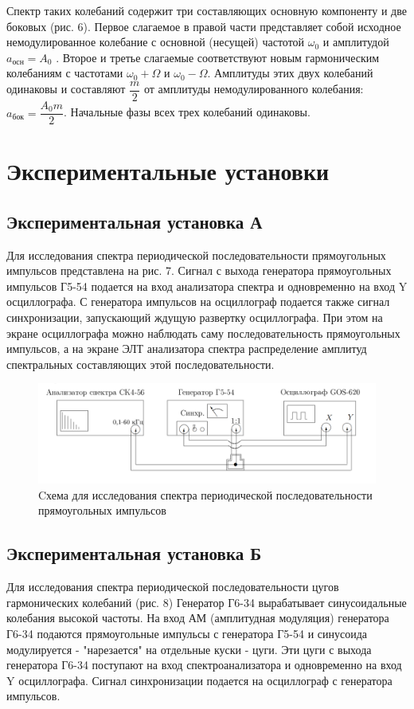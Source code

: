 \documentclass[a4paper, 14pt]{extarticle}%
\begin{document}
		Спектр таких колебаний содержит три составляющих  основную
		компоненту и две боковых (рис. 6). Первое слагаемое в правой части представляет собой исходное немодулированное колебание
		с основной (несущей) частотой $\omega_{0}$ и амплитудой $a_{осн} = A_{0}$ . Второе и третье слагаемые соответствуют новым гармоническим колебаниям с частотами $\omega_{0} + \Omega$ и $\omega_{0} - \Omega$. Амплитуды этих двух колебаний одинаковы и составляют $\dfrac{m}{2}$ от амплитуды немодулированного колебания:
		$a_{бок} = \dfrac{A_{0}m}{2}$. Начальные фазы всех трех колебаний одинаковы.


	\section{Экспериментальные установки}
	
		
		\subsection{Экспериментальная установка А} 
		Для исследования спектра периодической последовательности прямоугольных импульсов представлена на рис. 7. Сигнал с выхода генератора прямоугольных импульсов Г5-54 подается на
		вход анализатора спектра и одновременно  на вход Y осциллографа. С генератора импульсов на осциллограф подается также сигнал синхронизации, запускающий ждущую развертку осциллографа. При этом на экране осциллографа можно наблюдать саму последовательность прямоугольных импульсов, а на экране ЭЛТ анализатора спектра  распределение амплитуд спектральных составляющих этой последовательности.
		
					
		\begin{figure}[h!]
			\centering
			\includegraphics[width=0.8\linewidth]{pictures/sp7.png}
			\caption{Cхема для исследования спектра периодической последовательности прямоугольных импульсов}
			\label{A}
		\end{figure}
			
\subsection{Экспериментальная установка Б} 
Для исследования спектра периодической последовательности цугов гармонических колебаний (рис. 8) Генератор Г6-34 вырабатывает синусоидальные колебания высокой частоты. На вход АМ (амплитудная модуляция) генератора Г6-34 подаются прямоугольные импульсы с генератора Г5-54 и синусоида модулируется - "нарезается" на отдельные куски - цуги. Эти цуги с выхода генератора Г6-34 поступают на вход спектроанализатора и одновременно на вход Y осциллографа. Сигнал синхронизации подается на осциллограф с генератора импульсов.
		
\end{document}
